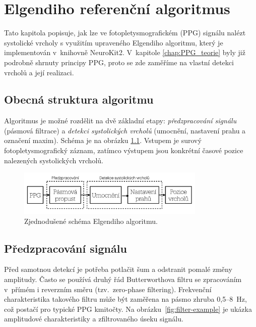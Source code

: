 \chapter{Elgendiho referenční algoritmus}
\label{chap:elgendi_neurokit}

Tato kapitola popisuje, jak lze ve fotopletysmografickém (\acs{PPG}) signálu nalézt systolické vrcholy s využitím upraveného Elgendiho algoritmu, který je implementován v~knihovně NeuroKit2.
V~kapitole \ref{chap:PPG_teorie} byly již podrobně shrnuty principy \acs{PPG}, proto se zde zaměříme na vlastní detekci vrcholů a její realizaci.

\section{Obecná struktura algoritmu}
Algoritmus je možné rozdělit na dvě základní etapy: \emph{předzpracování signálu} (pásmová filtrace) a \emph{detekci systolických vrcholů} (umocnění, nastavení prahu a označení maxim).
Schéma je na obrázku \ref{fig:alg-scheme}.
Vstupem je surový fotopletysmografický záznam, zatímco výstupem jsou konkrétní časové pozice nalezených systolických vrcholů.

\begin{figure}[htbp]
	\centering
	\includegraphics[width=0.8\textwidth]{./obrazky/ElgendiBlokSchema.png}
	\caption[Struktura Elgendiho algoritmu]{Zjednodušené schéma Elgendiho algoritmu.}
	\label{fig:alg-scheme}
\end{figure}

\section{Předzpracování signálu}
Před samotnou detekcí je potřeba potlačit šum a odstranit pomalé změny amplitudy.
Často se používá druhý řád Butterworthova filtru se zpracováním v~přímém i reverzním směru (tzv.~zero-phase filtering).
Frekvenční charakteristika takového filtru může být zaměřena na pásmo zhruba 0,5--8~Hz, což postačí pro typické PPG kmitočty.
Na obrázku~\ref{fig:filter-example} je ukázka amplitudové charakteristiky a zfiltrovaného úseku signálu.

